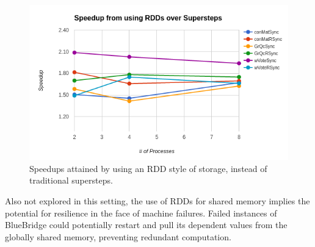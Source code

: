 \begin{figure}[h]
\includegraphics[width=\linewidth]{"fig/rdd_vs_ss"}
\caption{Speedups attained by using an RDD style of storage, instead of
 traditional supersteps.}
\label{fig:rdds}
\end{figure}

Also not explored in this setting, the use of RDDs for shared memory implies the
potential for resilience in the face of machine failures. Failed instances of
BlueBridge could potentially restart and pull its dependent values from the
globally shared memory, preventing redundant computation.